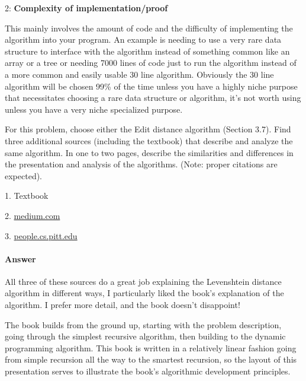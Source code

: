 \documentclass{article}
\begin{document}
\begin{enumerate}
    2: {\bf Complexity of implementation/proof}

This mainly involves the amount of code and the difficulty of implementing the algorithm into your program. An example is needing to use a very rare data structure to interface with the algorithm instead of something common like an array or a tree or needing 7000 lines of code just to run the algorithm instead of a more common and easily usable 30 line algorithm. Obviously the 30 line algorithm will be chosen 99\% of the time unless you have a highly niche purpose that necessitates choosing a rare data structure or algorithm, it's not worth using unless you have a very niche specialized purpose.

\end{enumerate}



For this problem, choose either the Edit distance algorithm (Section 3.7).
Find three additional sources (including the textbook) that describe
and analyze the same algorithm. In one to two pages, describe the similarities
and differences in the presentation and analysis of the algorithms. (Note:
proper citations are expected).

1. Textbook

2. \href{https://medium.com/@ethannam/understanding-the-levenshtein-distance-equation-for-beginners-c4285a5604f0}{medium.com}

3. \href{https://people.cs.pitt.edu/~kirk/cs1501/Pruhs/Spring2006/assignments/editdistance/Levenshtein%20Distance.htm}{people.cs.pitt.edu}

\paragraph{Answer}

All three of these sources do a great job explaining the Levenshtein distance algorithm in different ways, I particularly liked the book's explanation of the algorithm. I prefer more detail, and the book doesn't disappoint!

The book builds from the ground up, starting with the problem description, going through the simplest recursive algorithm, then building to the dynamic programming algorithm. This book is written in a relatively linear fashion going from simple recursion all the way to the smartest recursion, so the layout of this presentation serves to illustrate the book's algorithmic development principles.
\end{document}
